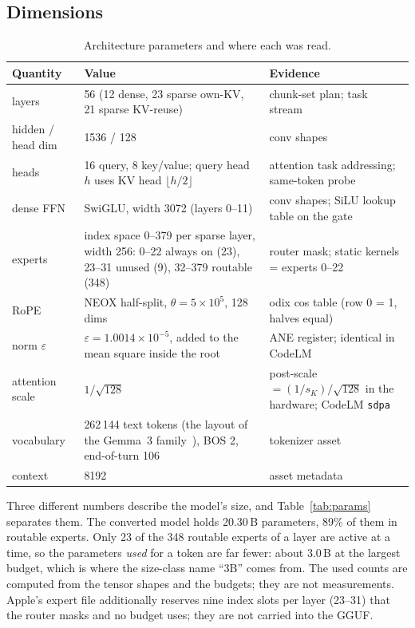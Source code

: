 \documentclass[11pt,reqno]{amsart}
\makeatletter
\newcommand{\code}[1]{\texttt{#1}}
\renewcommand\paragraph{\@startsection{paragraph}{4}\z@{.6\linespacing\@plus.2\linespacing}{-\fontdimen2\font}{\normalfont\bfseries}}
\theoremstyle{definition}
\makeatother
\begin{document}
\subsection{Dimensions}
\begin{table}[H]
\centering\small
\begin{tabular}{@{}p{25mm}p{78mm}p{55mm}@{}}
\toprule
Quantity & Value & Evidence \\
\midrule
layers & 56 (12 dense, 23 sparse own-KV, 21 sparse KV-reuse) & chunk-set plan; task stream \\
hidden / head dim & 1536 / 128 & conv shapes \\
heads & 16 query, 8 key/value; query head $h$ uses KV head $\lfloor h/2\rfloor$ & attention task addressing; same-token probe \\
dense FFN & SwiGLU, width 3072 (layers 0--11) & conv shapes; SiLU lookup table on the gate \\
experts & index space 0--379 per sparse layer, width 256: 0--22 always on (23), 23--31 unused (9), 32--379 routable (348) & router mask; static kernels = experts 0--22 \\
RoPE & NEOX half-split, $\theta=5\times10^5$, 128 dims & odix cos table (row 0 = 1, halves equal) \\
norm $\varepsilon$ & $\varepsilon = 1.0014\times10^{-5}$, added to the mean square inside the root & ANE register; identical in CodeLM \\
attention scale & $1/\sqrt{128}$ & post-scale $= (1/s_K)/\sqrt{128}$ in the hardware; CodeLM \code{sdpa} \\
vocabulary & 262\,144 text tokens (the layout of the Gemma~3 family~\cite{gemma3}), BOS 2, end-of-turn 106 & tokenizer asset \\
context & 8192 & asset metadata \\
\bottomrule
\end{tabular}
\caption{Architecture parameters and where each was read.}
\end{table}

\paragraph{Parameter accounting.} Three different numbers describe the model's size, and Table~\ref{tab:params} separates them. The converted model holds 20.30\,B parameters, 89\% of them in routable experts. Only 23 of the 348 routable experts of a layer are active at a time, so the parameters \emph{used} for a token are far fewer: about 3.0\,B at the largest budget, which is where the size-class name ``3B'' comes from. The used counts are computed from the tensor shapes and the budgets; they are not measurements. Apple's expert file additionally reserves nine index slots per layer (23--31) that the router masks and no budget uses; they are not carried into the GGUF.
\end{document}
